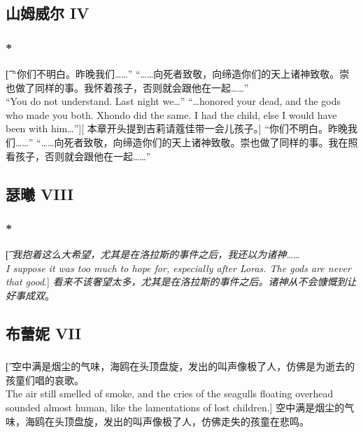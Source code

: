 \documentclass[12pt,a4paper]{article}
\begin{document}
\subsection{山姆威尔 IV}
\subsubsection{\color{red}*}\t[
	“你们不明白。昨晚我们……” “……向死者致敬，向缔造你们的天上诸神致敬。崇也做了同样的事。我怀着孩子，否则就会跟他在一起……”\\
	“You do not understand. Last night we\ldots”  “\ldots honored your dead, and the gods who made you both. Xhondo did the same. I had the child, else I would have been with him\ldots ”][
	本章开头提到吉莉请蔻佳带一会儿孩子。]
	“你们不明白。昨晚我们……” “……向死者致敬，向缔造你们的天上诸神致敬。崇也做了同样的事。我在照看孩子，否则就会跟他在一起……”
	
\subsection{瑟曦 VIII}
\subsubsection{\color{red}*}\t[
	\emph{我抱着这么大希望，尤其是在洛拉斯的事件之后，我还以为诸神……\\
	I suppose it was too much to hope for, especially after Loras. The gods are never that good}.]
	\emph{看来不该奢望太多，尤其是在洛拉斯的事件之后。诸神从不会慷慨到让好事成双}。
	
\subsection{布蕾妮 VII}
\subsubsection{}\t[
	空中满是烟尘的气味，海鸥在头顶盘旋，发出的叫声像极了人，仿佛是为逝去的孩童们唱的哀歌。\\
	The air still smelled of smoke, and the cries of the seagulls floating overhead sounded almost human, like the lamentations of lost children.]
	空中满是烟尘的气味，海鸥在头顶盘旋，发出的叫声像极了人，仿佛走失的孩童在悲鸣。
	
\end{document}

